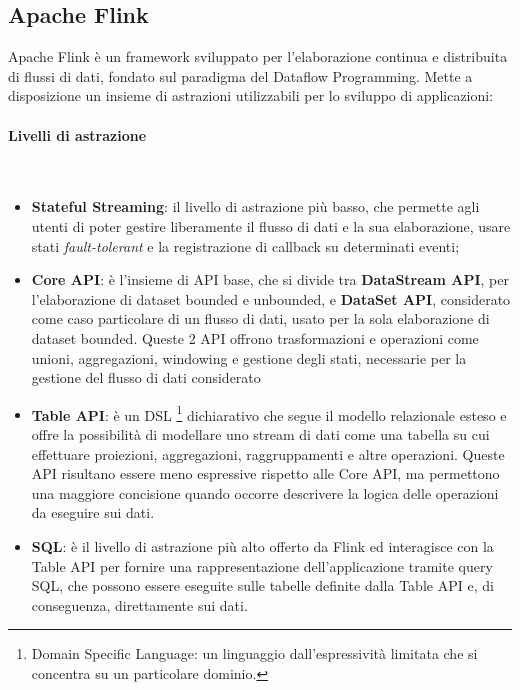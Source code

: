 \subsection{Apache Flink}\label{Flink}

Apache Flink è un framework sviluppato per l'elaborazione continua e distribuita di flussi di dati, fondato sul paradigma del Dataflow Programming. Mette a disposizione un insieme di astrazioni utilizzabili per lo sviluppo di applicazioni:

\paragraph{Livelli di astrazione}  \label{AbstractionLevels} ~\\

\begin{itemize}
	\item \textbf{Stateful Streaming}: il livello di astrazione più basso, che permette agli utenti di poter gestire liberamente il flusso di dati e la sua elaborazione, usare stati \textit{fault-tolerant} e la registrazione di callback su determinati eventi;
	\item \textbf{Core API}: è l'insieme di API base, che si divide tra \textbf{DataStream API}, per l'elaborazione di dataset bounded e unbounded, e \textbf{DataSet API}, considerato come caso particolare di un flusso di dati, usato per la sola elaborazione di dataset bounded. Queste 2 API offrono trasformazioni e operazioni come unioni, aggregazioni, windowing e gestione degli stati, necessarie per la gestione del flusso di dati considerato
	\item \textbf{Table API}: è un DSL \footnote{Domain Specific Language: un linguaggio dall'espressività limitata che si concentra su un particolare dominio.} dichiarativo che segue il modello relazionale esteso e offre la possibilità di modellare uno stream di dati come una tabella su cui effettuare proiezioni, aggregazioni, raggruppamenti e altre operazioni. Queste API risultano essere meno espressive rispetto alle Core API, ma permettono una maggiore concisione quando occorre descrivere la logica delle operazioni da eseguire sui dati.
	\item \textbf{SQL}: è il livello di astrazione più alto offerto da Flink ed interagisce con la Table API per fornire una rappresentazione dell'applicazione tramite query SQL, che possono essere eseguite sulle tabelle definite dalla Table API e, di conseguenza, direttamente sui dati.
\end{itemize}

